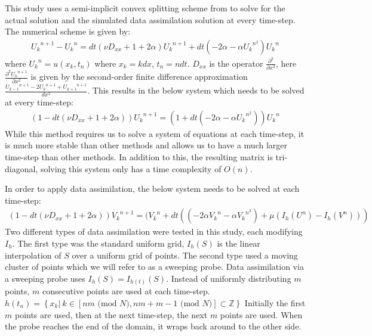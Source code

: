 \documentclass[12pt]{amsart}
\theoremstyle{plain}
\theoremstyle{definition}
\theoremstyle{remark}
\numberwithin{equation}{section} %
\numberwithin{figure}{section}   %
\newcommand{\field}[1]{\mathbb{#1}}
\newcommand{\nZ}{\field{Z}}
\begin{document}
This study uses a semi-implicit convex splitting scheme from \cite{Eyre}  to solve for the actual solution and the simulated data assimilation solution at every time-step. The numerical scheme is given by:
\begin{align*}
{U_k}^{n+1} - {U_k}^n = dt(\nu D_{xx} + 1+2\alpha){U_k}^{n+1} + dt(-2\alpha - \alpha {U_k}^{n^2}){{U_k}^n}
\end{align*} 
where ${U_k}^{n} = u(x_k,t_n)$ where $x_k = k dx$, $t_n = n dt$. 
$D_{xx}$ is the operator $\frac{\partial^2}{\partial x^2} $, here $\frac{\partial^2 {U_k}^{n+1}}{\partial x^2}$ is given by the second-order finite difference approximation $\frac{{U_{k-1}}^{n+1} - 2{U_{k}}^{n+1} + {U_{k+1}}^{n+1}}{dx^2} $. This results in the below system which needs to be solved at every time-step:
\begin{align*}
(1 - dt(\nu D_{xx} + 1+2\alpha)){U_k}^{n+1} =  (1+dt(-2\alpha - \alpha {U_k}^{n^2})){{U_k}^n}
\end{align*}
While this method requires us to solve a system of equations at each time-step, it is much more stable than other methods and allows us to have a much larger time-step than other methods. In addition to this, the resulting matrix is tri-diagonal, solving this system only has a time complexity of $O(n)$.

In order to apply data assimilation, the below system needs to be solved at each time-step:
\begin{align*}
(1 - dt(\nu D_{xx} + 1+2\alpha)){V_k}^{n+1} =  ({V_k}^n+dt((-2\alpha{V_k}^n - \alpha {V_k}^{n^3}) +\mu(I_h(U^n) - I_h(V^n)))
\end{align*}
Two different types of data assimilation were tested in this study, each modifying $I_h$. The first type was the standard uniform grid, $I_h(S)$ is the linear interpolation of $S$ over a uniform grid of points. The second type used a moving cluster of points which we will refer to as a sweeping probe. Data assimilation via a sweeping probe uses $I_h(S) = I_{h(t)}(S)$. Instead of uniformly distributing $m$ points, $m$ consecutive points are used at each time-step. \\
$h{(t_n)} = \left\{x_k |~ k\in [nm \text{ (mod } N),nm+m-1 \text{ (mod } N)] \subset\nZ \right\}$ Initially the first $m$ points are used, then at the next time-step, the next $m$ points are used. When the probe reaches the end of the domain, it wraps back around to the other side.  
\end{document}

